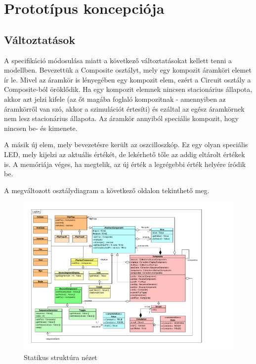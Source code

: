 %
\chapter{Prototípus koncepciója}

\parindent 0pt
\setcounter{secnumdepth}{3}
\setcounter{tocdepth}{3}
\thispagestyle{fancy}

\setcounter{section}{-1}
\section{Változtatások}

A specifikáció módosulása miatt a következő változtatásokat kellett tenni a modellben.
Bevezettük a Composite osztályt, mely egy kompozit áramköri elemet ír le. Mivel az áramkör is lényegében egy kompozit elem, ezért a Circuit osztály a Composite-ból öröklődik. Ha egy kompozit elemnek nincsen stacionárius állapota, akkor azt jelzi kifele (az őt magába foglaló kompozitnak - amennyiben az áramkörről van szó, akkor a szimulációt értesíti) és ezáltal az egész áramkörnek nem lesz stacionárius állapota. Az áramkör annyiból speciális kompozit, hogy nincsen be- és kimenete.

A másik új elem, mely bevezetésre került az oszcilloszkóp. Ez egy olyan speciális LED, mely kijelzi az aktuális értékét, de lekérhető tőle az addig eltárolt értékek is. A memóriája véges, ha megtelik, az új érték a legrégebbi érték helyére íródik be.

A megváltozott osztálydiagram a következő oldalon tekinthető meg.

\begin{figure}[H]
\begin{center}
\includegraphics*[angle=90, width=17cm, viewport = 25 30 720 565]{chapters/chapter04/classdiagram/class.pdf}
\caption{Statikus struktúra nézet}
\label{fig:class_diagram}
\end{center}
\end{figure}

